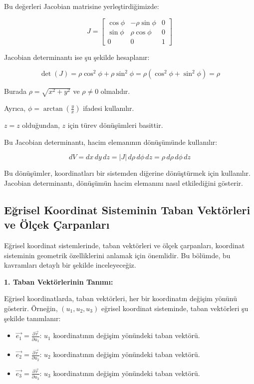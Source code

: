 \documentclass[11pt,letterpaper,twocolumn]{fenbil}
\begin{document}
Bu değerleri Jacobian matrisine yerleştirdiğimizde:

\begin{equation}
J = \begin{bmatrix}
\cos \phi & -\rho \sin \phi & 0 \\
\sin \phi & \rho \cos \phi & 0 \\
0 & 0 & 1
\end{bmatrix}
\end{equation}

Jacobian determinantı ise şu şekilde hesaplanır:

\begin{equation}
\det(J) = \rho \cos^2 \phi + \rho \sin^2 \phi = \rho (\cos^2 \phi + \sin^2 \phi) = \rho
\end{equation}

Burada $\rho = \sqrt{x^2 + y^2}$ ve $\rho \neq 0$ olmalıdır.

Ayrıca, $\phi = \arctan \left( \frac{y}{x} \right)$ ifadesi kullanılır.

$z = z$ olduğundan, $z$ için türev dönüşümleri basittir.

Bu Jacobian determinantı, hacim elemanının dönüşümünde kullanılır:

\begin{equation}
dV = dx \, dy \, dz = |J| \, d\rho \, d\phi \, dz = \rho \, d\rho \, d\phi \, dz
\end{equation}

Bu dönüşümler, koordinatları bir sistemden diğerine dönüştürmek için kullanılır. Jacobian determinantı, dönüşümün hacim elemanını nasıl etkilediğini gösterir.

\subsection{Eğrisel Koordinat Sisteminin Taban Vektörleri ve Ölçek Çarpanları}

Eğrisel koordinat sistemlerinde, taban vektörleri ve ölçek çarpanları, koordinat sisteminin geometrik özelliklerini anlamak için önemlidir. Bu bölümde, bu kavramları detaylı bir şekilde inceleyeceğiz.

\textbf{1. Taban Vektörlerinin Tanımı:}

Eğrisel koordinatlarda, taban vektörleri, her bir koordinatın değişim yönünü gösterir. Örneğin, $(u_1, u_2, u_3)$ eğrisel koordinat sisteminde, taban vektörleri şu şekilde tanımlanır:

\begin{itemize}
    \item $\vec{e_1} = \frac{\partial \vec{r}}{\partial u_1}$: $u_1$ koordinatının değişim yönündeki taban vektörü.
    \item $\vec{e_2} = \frac{\partial \vec{r}}{\partial u_2}$: $u_2$ koordinatının değişim yönündeki taban vektörü.
    \item $\vec{e_3} = \frac{\partial \vec{r}}{\partial u_3}$: $u_3$ koordinatının değişim yönündeki taban vektörü.
\end{itemize}
\end{document}
